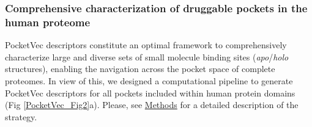 




\subsubsection{Comprehensive characterization of druggable pockets in the human proteome}
\label{PocketVec_ResultsAndDiscussion_Comprehensive_characterization}

PocketVec descriptors constitute an optimal framework to comprehensively characterize large and diverse sets of small molecule binding sites (\textit{apo}/\textit{holo} structures), enabling the navigation across the pocket space of complete proteomes. In view of this, we designed a computational pipeline to generate PocketVec descriptors for all pockets included within human protein domains (Fig \ref{PocketVec_Fig2}a). Please, see \hyperref[PocketVec_Methods]{Methods} for a detailed description of the strategy.



